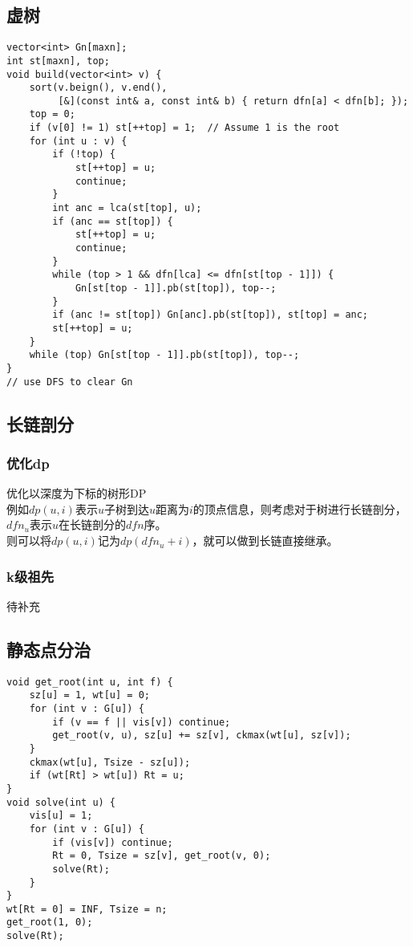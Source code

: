 \documentclass[twoside]{article}
\begin{document}
\subsection{虚树}
\begin{lstlisting}
vector<int> Gn[maxn];
int st[maxn], top;
void build(vector<int> v) {
	sort(v.beign(), v.end(),
	     [&](const int& a, const int& b) { return dfn[a] < dfn[b]; });
	top = 0;
	if (v[0] != 1) st[++top] = 1;  // Assume 1 is the root
	for (int u : v) {
		if (!top) {
			st[++top] = u;
			continue;
		}
		int anc = lca(st[top], u);
		if (anc == st[top]) {
			st[++top] = u;
			continue;
		}
		while (top > 1 && dfn[lca] <= dfn[st[top - 1]]) {
			Gn[st[top - 1]].pb(st[top]), top--;
		}
		if (anc != st[top]) Gn[anc].pb(st[top]), st[top] = anc;
		st[++top] = u;
	}
	while (top) Gn[st[top - 1]].pb(st[top]), top--;
}
// use DFS to clear Gn\end{lstlisting}
\subsection{长链剖分}
\subsubsection{优化dp}
\noindent 优化以深度为下标的树形DP\\
例如$dp(u,i)$表示$u$子树到达$u$距离为$i$的顶点信息，则考虑对于树进行长链剖分，$dfn_u$表示$u$在长链剖分的$dfn$序。\\
则可以将$dp(u,i)$记为$dp(dfn_u+i)$，就可以做到长链直接继承。
\subsubsection{k级祖先}
待补充

\subsection{静态点分治}
\begin{lstlisting}
void get_root(int u, int f) {
	sz[u] = 1, wt[u] = 0;
	for (int v : G[u]) {
		if (v == f || vis[v]) continue;
		get_root(v, u), sz[u] += sz[v], ckmax(wt[u], sz[v]);
	}
	ckmax(wt[u], Tsize - sz[u]);
	if (wt[Rt] > wt[u]) Rt = u;
}
void solve(int u) {
	vis[u] = 1;
	for (int v : G[u]) {
		if (vis[v]) continue;
		Rt = 0, Tsize = sz[v], get_root(v, 0);
		solve(Rt);
	}
}
wt[Rt = 0] = INF, Tsize = n;
get_root(1, 0);
solve(Rt);\end{lstlisting}
\end{document}
